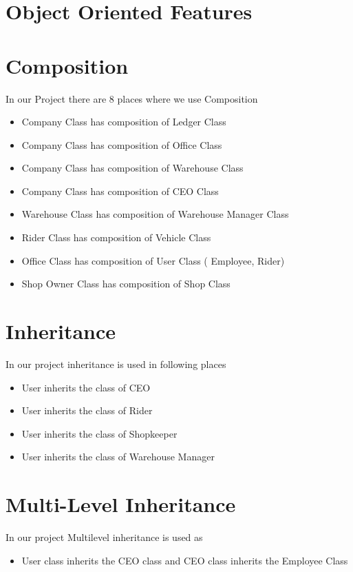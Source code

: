 \documentclass[12pt,a4paper]{article}
\begin{document}
\section{Object Oriented Features}
\section*{Composition}
In our Project there are 8 places where we use Composition
\begin{itemize}
\item   Company Class has composition of Ledger Class
\item  Company Class has composition of Office Class
\item  Company Class has composition of Warehouse Class
\item  Company Class has composition of CEO Class
\item  Warehouse Class has composition of  Warehouse Manager Class
\item  Rider Class has composition of Vehicle Class
\item  Office Class has composition of User Class ( Employee, Rider)
\item  Shop Owner Class has composition of Shop Class
\end{itemize}
\section*{Inheritance}
In our project inheritance is used in following places
\begin{itemize}
\item   User inherits the class of CEO
\item User inherits the class of Rider 
\item User inherits the class of Shopkeeper
\item User inherits the class of Warehouse Manager  
\end{itemize}
\section*{Multi-Level Inheritance}
In our project Multilevel inheritance is used as
\begin{itemize}
\item User class inherits the CEO class and CEO class inherits the Employee Class
\end{itemize}
\end{document}
